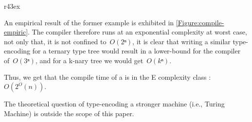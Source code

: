\begin{wrapfigure}r{43ex}%
  \caption{\label{Figure:compile-empiric} Compile time (sec) \emph{vs.} sequential method invocation length}%
\end{wrapfigure}%

An empirical result of the former example is exhibited in \cref{Figure:compile-empiric}.
The \Java compiler therefore runs at an exponential complexity at worst case,
  not only that, it is not confined to~$O(2ⁿ)$, it is clear that
  writing a similar type-encoding for a ternary type tree would result in
  a lower-bound for the \Java compiler of~$O(3ⁿ)$, and for a k-nary tree
  we would get~$O(kⁿ)$.

Thus, we get that the compile time of a \Java is in the E complexity class :~$O(2^O(n))$.

The theoretical question of type-encoding a stronger machine (i.e., Turing Machine)
  is outside the scope of this paper.
